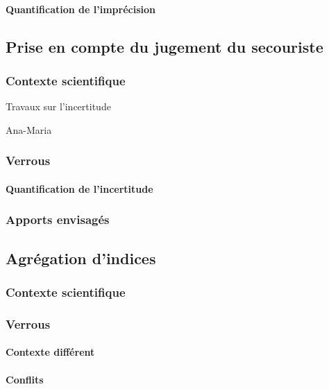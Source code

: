 \paragraph{Quantification de l'imprécision}

\subsection{Prise en compte du jugement du secouriste}
\label{subsec:2-1-3}

\subsubsection{Contexte scientifique}

Travaux sur l'incertitude

Ana-Maria

\subsubsection{Verrous}

\paragraph{Quantification de l'incertitude}


\subsubsection{Apports envisagés}

\subsection{Agrégation d'indices}
\label{subsec:2-1-4}

\subsubsection{Contexte scientifique}

\subsubsection{Verrous}

\paragraph{Contexte différent}

\paragraph{Conflits}

